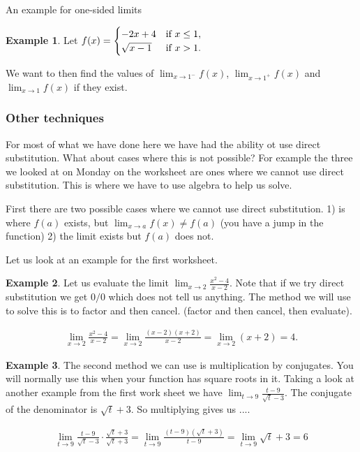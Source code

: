 \documentclass[12pt,reqno]{article}
\theoremstyle{definition}
\newtheorem*{Example}{Example}
\begin{document}
An example for one-sided limits 
\begin{Example}
	Let $f(x) = \begin{cases}
		-2x + 4 & \textnormal{if } x \leq 1, \\
		\sqrt{x - 1} & \textnormal{if } x > 1.
	\end{cases}$  

We want to then find the values of $\lim_{x \to 1^-} f(x)$, $\lim_{x \to 1^+} f(x)$ and $\lim_{x \to 1} f(x)$ if they exist. 
\end{Example}


\subsubsection{Other techniques}

For most of what we have done here we have had the ability ot use direct substitution. What about cases where this is not possible? For example the three we looked at on Monday on the worksheet are ones where we cannot use direct substitution. This is where we have to use algebra to help us solve. 

First there are two possible cases where we cannot use direct substitution. 1) is where $f(a)$ exists, but $\lim_{x \to a} f(x) \neq f(a)$ (you have a jump in the function) 2) the limit exists but $f(a)$ does not. 

Let us look at an example for the first worksheet. 
\begin{Example}
	Let us evaluate the limit $\lim_{x \to 2} \frac{x^2 - 4} {x - 2}$. Note that if we try direct substitution we get $0/0$ which does not tell us anything. The method we will use to solve this is to factor and then cancel. (factor and then cancel, then evaluate).  
	
	\begin{align*}
		\lim_{x \to 2} \frac{x^2 -4}{x - 2} = \lim_{x\to 2} \frac{(x -2)(x +2)}{x -2} = \lim_{x \to 2} (x + 2) = 4.
	\end{align*}
\end{Example}

\begin{Example}
	The second method we can use is multiplication by conjugates. You will normally use this when your function has square roots in it. Taking a look at another example from the first work sheet we have  $\lim_{t \to 9} \frac{t - 9}{\sqrt{t} - 3}$. The conjugate of the denominator is $\sqrt{t} +3$. So multiplying gives us .... 
	
	\begin{align*}
		\lim_{t \to 9}  \frac{t - 9}{\sqrt{t} - 3} \cdot \frac{\sqrt{t} + 3}{\sqrt{t} +3} = \lim_{t \to 9} \frac{(t - 9) (\sqrt{t} + 3)}{t - 9} = \lim_{t \to 9} \sqrt{t} + 3 = 6
	\end{align*}
\end{Example}
\end{document}
